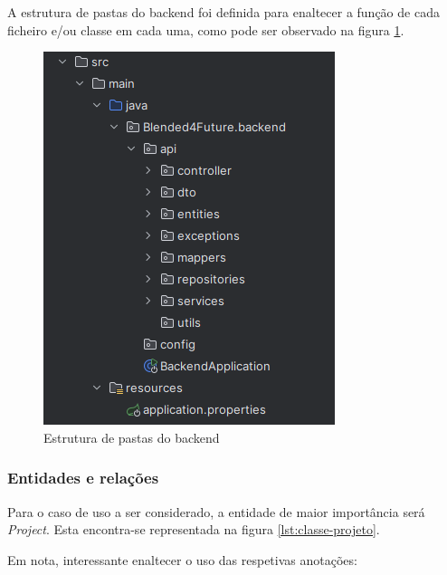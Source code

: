 A estrutura de pastas do backend foi definida para enaltecer a função de cada ficheiro e/ou classe em cada uma, como pode ser observado na figura \ref{fig:folder-struct-backend}.

\begin{figure}[h!tbp]
    \centering
    \includegraphics[width=0.5\linewidth]{capitulos/cap4-implementacao/assets/fold-struct-backend.png}
    \caption{Estrutura de pastas do backend}
    \label{fig:folder-struct-backend}
\end{figure}

\subsubsection{Entidades e relações}

Para o caso de uso a ser considerado, a entidade de maior importância será \textit{Project}. Esta encontra-se representada na figura \ref{lst:classe-projeto}.

Em nota, interessante enaltecer o uso das respetivas anotações:

